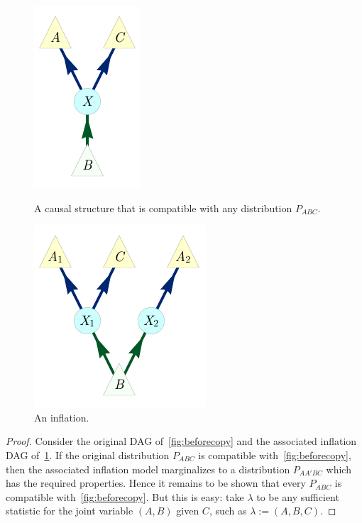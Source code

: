\begin{figure}[t]
\centering
\hspace{40pt}
\begin{minipage}[t]{0.23\linewidth}
\centering
\includegraphics[scale=1]{shannonnocopy.pdf}
\caption{A causal structure that is compatible with any distribution $P_{ABC}$.}\label{fig:beforecopy}
\end{minipage}
\hfill
\begin{minipage}[t]{0.38\linewidth}
\centering
\includegraphics[scale=1]{shannonyescopy}
\caption{An inflation.}\label{fig:aftercopy}
\end{minipage}
\hspace{40pt}
\end{figure}

\begin{proof}
	Consider the original DAG of~\cref{fig:beforecopy} and the associated inflation DAG of~\cref{fig:aftercopy}. If the original distribution $P_{ABC}$ is compatible with~\cref{fig:beforecopy}, then the associated inflation model marginalizes to a distribution $P_{AA'BC}$ which has the required properties. Hence it remains to be shown that every $P_{ABC}$ is compatible with~\cref{fig:beforecopy}. But this is easy: take $\lambda$ to be any sufficient statistic for the joint variable $(A,B)$ given $C$, such as $\lambda := (A,B,C)$.
\end{proof}

